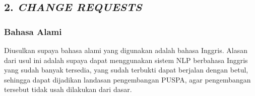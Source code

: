 \subsection*{\textcolor{subsectioncolor}{\textsf{2. \textit{CHANGE REQUESTS}}}}

\subsubsection*{Bahasa Alami}
Diusulkan supaya bahasa alami yang digunakan adalah bahasa Inggris.
Alasan dari usul ini adalah supaya dapat menggunakan sistem NLP berbahasa Inggris yang sudah banyak tersedia,
yang sudah terbukti dapat berjalan dengan betul,
sehingga dapat dijadikan landasan pengembangan PUSPA,
agar pengembangan tersebut tidak usah dilakukan dari dasar.
